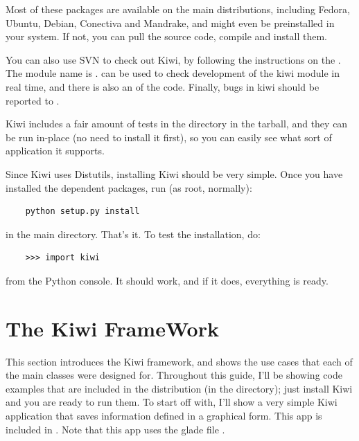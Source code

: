 \documentclass[a4paper]{howto}
\begin{document}
Most of these packages are available on the main distributions,
including Fedora, Ubuntu, Debian, Conectiva and Mandrake, and might even be
preinstalled in your system. If not, you can pull the source code,
compile and install them.

You can also use SVN to check out Kiwi, by following the instructions on
the . The module name is .
 can be used to check development of the kiwi module in
real time, and there is also an
 of the code.
Finally, bugs in kiwi should be reported to
.

Kiwi includes a fair amount of tests in the  directory in
the tarball, and they can be run in-place (no need to install it first),
so you can easily see what sort of application it supports.

Since Kiwi uses Distutils, installing Kiwi should be very simple.  Once
you have installed the dependent packages, run (as root, normally):

    \begin{verbatim}
    python setup.py install
    \end{verbatim}

in the main directory. That's it. To test the installation, do:

    \begin{verbatim}
    >>> import kiwi
    \end{verbatim}

from the Python console. It should work, and if it does, everything
is ready.

\section{The Kiwi FrameWork}
\label{person}

This section introduces the Kiwi framework, and shows the use cases that
each of the main classes were designed for. Throughout this guide, I'll
be showing code examples that are included in the distribution (in the
 directory); just install Kiwi and you are ready to run
them. To start off with, I'll show a very simple Kiwi application that
saves information defined in a graphical form. This app is included in
.  Note that this app uses the
glade file .
\end{document}

